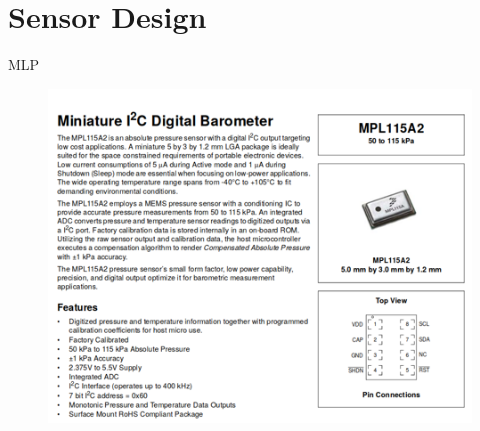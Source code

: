 \documentclass[12pt]{article}
\begin{document}


\section{Sensor Design}


MLP
\begin{figure}[H]
\centering
\includegraphics[width=.5\textwidth]{images/sensor/old_datasheet.png}
\end{figure}
\end{document}
